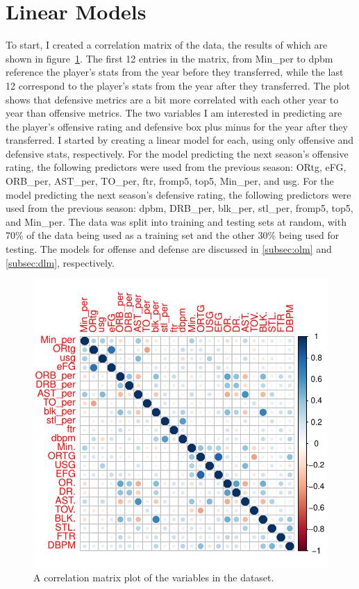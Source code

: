 \documentclass[12pt]{article}
\begin{document}
\section{Linear Models}
\label{sec:lms}
To start, I created a correlation matrix of the data, the results of which are shown in figure~\ref{fig:corrplot}. The first 12 entries in the matrix, from Min\_per to dpbm reference the player's stats from the year before they transferred, while the last 12 correspond to the player's stats from the year after they transferred. The plot shows that defensive metrics are a bit more correlated with each other year to year than offensive metrics. The two variables I am interested in predicting are the player's offensive rating and defensive box plus minus for the year after they transferred. I started by creating a linear model for each, using only offensive and defensive stats, respectively. For the model predicting the next season's offensive rating, the following predictors were used from the previous season: ORtg, eFG, ORB\_per, AST\_per, TO\_per, ftr, fromp5, top5, Min\_per, and usg. For the model predicting the next season's defensive rating, the following predictors were used from the previous season: dpbm, DRB\_per, blk\_per, stl\_per, fromp5, top5, and Min\_per. The data was split into training and testing sets at random, with 70\% of the data being used as a training set and the other 30\% being used for testing. The models for offense and defense are discussed in \ref{subsec:olm} and \ref{subsec:dlm}, respectively.

\begin{figure}[tbp]
	\centering
	\includegraphics[width=\textwidth]{corrplot}
	\caption{A correlation matrix plot of the variables in the dataset.}
	\label{fig:corrplot}
\end{figure}
\end{document}
